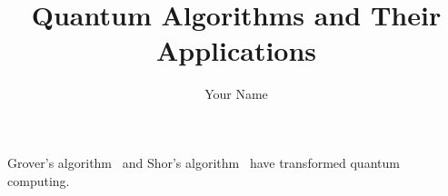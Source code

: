 \documentclass{article}
\begin{document}
\title{Quantum Algorithms and Their Applications}
\author{Your Name}
\maketitle

Grover's algorithm~\cite{grover1996} and Shor's algorithm~\cite{shor1994} have transformed quantum computing.



\end{document}
